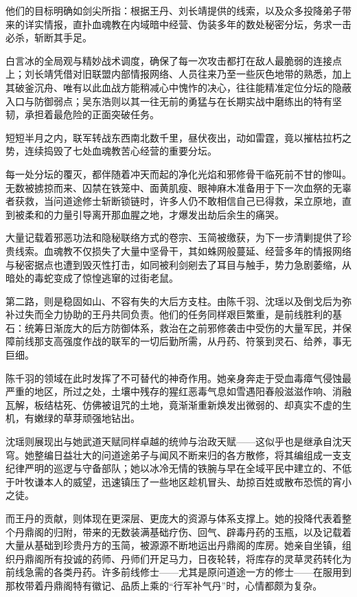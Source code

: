 他们的目标明确如剑尖所指：根据王丹、刘长靖提供的线索，以及众多投降弟子带来的详实情报，直扑血魂教在内域暗中经营、伪装多年的数处秘密分坛，务求一击必杀，斩断其手足。

白言冰的全局观与精妙战术调度，确保了每一次攻击都打在敌人最脆弱的连接点上；刘长靖凭借对旧联盟内部情报网络、人员往来乃至一些灰色地带的熟悉，加上其破釜沉舟、唯有以此血战方能稍减心中愧怍的决心，往往能精准定位分坛的隐蔽入口与防御弱点；吴东浩则以其一往无前的勇猛与在长期实战中磨练出的特有坚韧，承担着最危险的正面突破任务。

短短半月之内，联军转战东西南北数千里，昼伏夜出，动如雷霆，竟以摧枯拉朽之势，连续捣毁了七处血魂教苦心经营的重要分坛。

每一处分坛的覆灭，都伴随着冲天而起的净化光焰和邪修骨干临死前不甘的惨叫。无数被掳掠而来、囚禁在铁笼中、面黄肌瘦、眼神麻木准备用于下一次血祭的无辜者获救，当问道途修士斩断锁链时，许多人仍不敢相信自己已得救，呆立原地，直到被柔和的力量引导离开那血腥之地，才爆发出劫后余生的痛哭。

大量记载着邪恶功法和隐秘联络方式的卷宗、玉简被缴获，为下一步清剿提供了珍贵线索。血魂教不仅损失了大量中坚骨干，其如蛛网般蔓延、经营多年的情报网络与秘密据点也遭到毁灭性打击，如同被利剑剜去了耳目与触手，势力急剧萎缩，从暗处的毒蛇变成了惊惶逃窜的过街老鼠。

\vspace{2em}

第二路，则是稳固如山、不容有失的大后方支柱。由陈千羽、沈瑶以及倒戈后为弥补过失而全力协助的王丹共同负责。他们的任务同样艰巨繁重，是前线胜利的基石：统筹日渐庞大的后方防御体系，救治在之前邪修袭击中受伤的大量军民，并保障前线那支高强度作战的联军的一切后勤所需，从丹药、符箓到灵石、给养，事无巨细。

陈千羽的领域在此时发挥了不可替代的神奇作用。她亲身奔走于受血毒瘴气侵蚀最严重的地区，所过之处，土壤中残存的猩红恶毒气息如雪遇阳春般滋滋作响、消融瓦解，板结枯死、仿佛被诅咒的土地，竟渐渐重新焕发出微弱的、却真实不虚的生机，有嫩绿的草芽顽强地钻出。

沈瑶则展现出与她武道天赋同样卓越的统帅与治政天赋——这似乎也是继承自沈天穹。她整编日益壮大的问道途弟子与闻风不断来归的各方散修，将其编组成一支支纪律严明的巡逻与守备部队；她以冰冷无情的铁腕与早在全域平民中建立的、不低于叶牧谦本人的威望，迅速镇压了一些地区趁机冒头、劫掠百姓或散布恐慌的宵小之徒。

而王丹的贡献，则体现在更深层、更庞大的资源与体系支撑上。她的投降代表着整个丹鼎阁的归附，带来的无数装满基础疗伤、回气、辟毒丹药的玉瓶，以及记载着大量从基础到珍贵丹方的玉简，被源源不断地运出丹鼎阁的库房。她亲自坐镇，组织丹鼎阁所有投诚的药师、丹师们开足马力，日夜轮转，将库存的灵草灵药转化为前线急需的各类丹药。许多前线修士——尤其是原问道途一方的修士——在服用到那枚带着丹鼎阁特有徽记、品质上乘的“行军补气丹”时，心情都颇为复杂。

